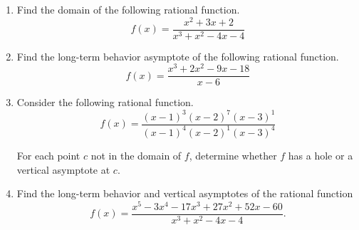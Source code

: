 \documentclass{article}
\begin{document}
\ActivityTitle[class={College Algebra}, number={6}, name={Rational Functions}]

\begin{enumerate}
\item Find the domain of the following rational function. \[ f(x) = \frac{x^2 + 3x + 2}{x^3 + x^2 - 4x - 4} \] \vspace{3cm}

\item Find the long-term behavior asymptote of the following rational function. \[ f(x) = \frac{x^3 + 2x^2 - 9x - 18}{x - 6} \] \vspace{7cm}

\item Consider the following rational function. \[ f(x) = \frac{(x-1)^{3}(x-2)^{7}(x-3)^{1}}{(x-1)^{4}(x-2)^{1}(x-3)^{4}} \]

For each point $c$ not in the domain of $f$, determine whether $f$ has a hole or a vertical asymptote at $c$. \vspace{3cm}

\newpage

\item Find the long-term behavior and vertical asymptotes of the rational function \[ f(x) = \frac{x^5 - 3x^4 - 17x^3 + 27x^2 + 52x - 60}{x^3 + x^2 - 4x - 4}. \] \vspace{3cm}
\end{enumerate}
\end{document}
